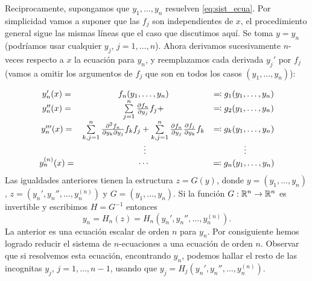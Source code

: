 Reciprocamente, supongamos que $y_1,\ldots,y_n$ resuelven \eqref{eq:sist_ecua}. Por simplicidad vamos a suponer que las $f_j$ son independientes de $x$, el procedimiento general sigue las mismas líneas que el caso que discutimos aquí. Se toma $y=y_n$ (podríamos usar cualquier $y_j$, $j=1,\ldots,n$). Ahora derivamos sucesivamente $n$-veces respecto a $x$ la ecuación para $y_n$,  y reemplazamos cada derivada $y_j'$ por $f_j$ (vamos a omitir los argumentos de $f_j$ que son en todos los casos $(y_1,\ldots,y_n)$):

\[%
\begin{array}{c c c}
y_n'(x) =& f_n(y_1,\ldots,y_n) &\eqqcolon g_1(y_1,\ldots,y_n)\\
 y_n''(x)=&\sum\limits_{j=1}^n\frac{\partial f_n}{\partial y_j}f_j+
 & \eqqcolon g_2(y_1,\ldots,y_n)\\
  y_n'''(x)=&\sum\limits_{k,j=1}^n\frac{\partial^2 f_n}{\partial y_k \partial y_j}f_kf_j+
  \sum\limits_{k,j=1}^n\frac{\partial f_n}{\partial y_j}\frac{\partial f_j}{\partial y_k}f_k & \eqqcolon g_k(y_1,\ldots,y_n)\\
  &\,\,\vdots &\,\,\vdots \\
  y^{(n)}_n(x) =&\cdots & \eqqcolon g_n(y_1,\ldots,y_n)
  \\
\end{array}
\]
Las igualdades anteriores tienen la estructura $z=G(y)$, donde $y=(y_1,\ldots,y_n)$, $z=(y_n',y_n'',\ldots,y_n^{(n)})$ y $G=(y_1,\ldots,y_n)$. Si la función $G:\rr^n\to\rr^n$ es invertible y escribimos $H=G^{-1}$ entonces
\[y_n=H_n(z)=H_n(y_n',y_n'',\ldots,y_n^{(n)}).\]
La anterior es una ecuación escalar de orden $n$ para $y_n$. Por consiguiente hemos logrado reducir el sistema de $n$-ecuaciones a una ecuación de orden $n$. Observar que si resolvemos esta ecuación, encontrando $y_n$, podemos hallar el resto de las incognitas $y_j$, $j=1,\ldots,n-1$,  usando que $y_j=H_j(y_n',y_n'',\ldots,y_n^{(n)})$.


